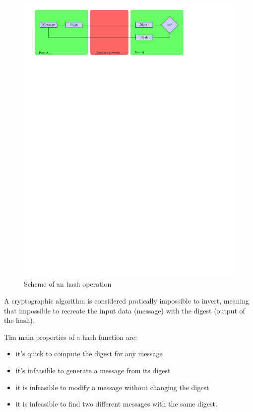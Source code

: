 \begin{figure}[!ht]
\centering
\includegraphics[trim=3.5cm 22.5cm 7.cm 0cm]{figures/hash.pdf}
\caption{Scheme of an hash operation\newline}
\label{fig:hash}

\end{figure}

A cryptographic algorithm is considered pratically impossible to invert, meaning
that impossible to recreate the input data (message) with the digest (output of
the hash).

Tha main properties of a hash function are:
\begin{itemize}
  \item it's quick to compute the digest for any message
  \item it's infeasible to generate a message from its digest
  \item it is infeasible to modify a message without changing the digest
  \item it is infeasible to find two different messages with the same
  digest.\newline
\end{itemize}

